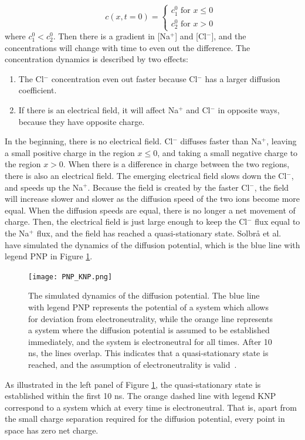\documentclass{uiophd}
\begin{document}
\begin{equation}
 \qquad c\left(x,t=0\right) = \begin{cases}
  c_1^0 \text{ for } x \leq 0 \\
  c_2^0 \text{ for } x>0 
  \end{cases}
  \label{eq:step_function }
\end{equation}
where $c_1^0<c_2^0$. Then there is a gradient in [Na$^+$] and [Cl$^-$], and the concentrations will change with time to even out the difference. The concentration dynamics is described by two effects:
\begin{enumerate}
\item The Cl$^-$ concentration even out faster because Cl$^-$ has a larger diffusion coefficient. 
\item If there is an electrical field, it will affect  Na$^+$ and Cl$^-$ in opposite ways, because they have opposite charge.
\end{enumerate}
In the beginning, there is no electrical field. Cl$^-$ diffuses faster than Na$^+$, leaving a small positive charge in the region $x\leq 0$, and taking a small negative charge to the region $x>0$. When there is a difference in charge between the two regions, there is also an electrical field. The emerging electrical field slows down the Cl$^-$, and speeds up the Na$^+$. Because the field is created by the faster Cl$^-$, the field will increase slower and slower as the diffusion speed of the two ions become more equal. When the diffusion speeds are equal, there is no longer a net movement of charge. Then, the electrical field is just large enough to keep the Cl$^-$ flux equal to the Na$^+$ flux, and the field has reached a quasi-stationary state.  Solbr{\aa} et al.\ \cite{Solbraa} have simulated the dynamics of the diffusion potential, which is the blue line with legend PNP in Figure \ref{fig:PNP_KNP}.  

\begin{figure}
  \centering
  \texttt{[image: PNP\_KNP.png]}
  \caption{The simulated dynamics of the diffusion potential. The blue line with legend PNP represents the potential of a system which allows for deviation from electroneutrality, while the orange line represents a system where the diffusion potential is assumed to be established immediately, and the system is electroneutral for all times. After 10 ns, the lines overlap. This indicates that a quasi-stationary state is reached, and the assumption of electroneutrality is valid~\cite{Solbraa}.}
  \label{fig:PNP_KNP}
\end{figure}
As illustrated in the left panel of Figure \ref{fig:PNP_KNP}, the quasi-stationary state is established within the first 10 ns. The orange dashed line with legend KNP correspond to a system which at every time is electroneutral. That is, apart from the small charge separation required for the diffusion potential, every point in space has zero net charge. 
\end{document}
